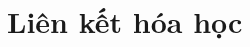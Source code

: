 \documentclass[Main.tex]{subfiles}
\begin{document}
	\setcounter{chapter}{2}
	\chapter{Liên kết hóa học}
	\hienthiloigiai
	
	
	
	
\end{document}
